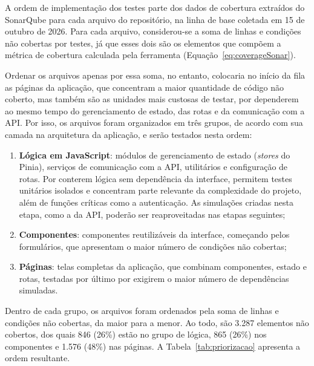 A ordem de implementação dos testes parte dos dados de cobertura extraídos do SonarQube para cada arquivo do repositório, na linha de base coletada em 15 de outubro de 2026.
Para cada arquivo, considerou-se a soma de linhas e condições não cobertas por testes, já que esses dois são os elementos que compõem a métrica de cobertura calculada pela ferramenta (Equação~\ref{eq:coverageSonar}).

Ordenar os arquivos apenas por essa soma, no entanto, colocaria no início da fila as páginas da aplicação, que concentram a maior quantidade de código não coberto, mas também são as unidades mais custosas de testar, por dependerem ao mesmo tempo do gerenciamento de estado, das rotas e da comunicação com a API.
Por isso, os arquivos foram organizados em três grupos, de acordo com sua camada na arquitetura da aplicação, e serão testados nesta ordem:

\begin{enumerate}
	\item \textbf{Lógica em JavaScript}: módulos de gerenciamento de estado (\textit{stores} do Pinia), serviços de comunicação com a API, utilitários e configuração de rotas. Por conterem lógica sem dependência da interface, permitem testes unitários isolados e concentram parte relevante da complexidade do projeto, além de funções críticas como a autenticação. As simulações criadas nesta etapa, como a da API, poderão ser reaproveitadas nas etapas seguintes;
	\item \textbf{Componentes}: componentes reutilizáveis da interface, começando pelos formulários, que apresentam o maior número de condições não cobertas;
	\item \textbf{Páginas}: telas completas da aplicação, que combinam componentes, estado e rotas, testadas por último por exigirem o maior número de dependências simuladas.
\end{enumerate}

Dentro de cada grupo, os arquivos foram ordenados pela soma de linhas e condições não cobertas, da maior para a menor.
Ao todo, são 3.287 elementos não cobertos, dos quais 846 (26\%) estão no grupo de lógica, 865 (26\%) nos componentes e 1.576 (48\%) nas páginas.
A Tabela~\ref{tab:priorizacao} apresenta a ordem resultante.

